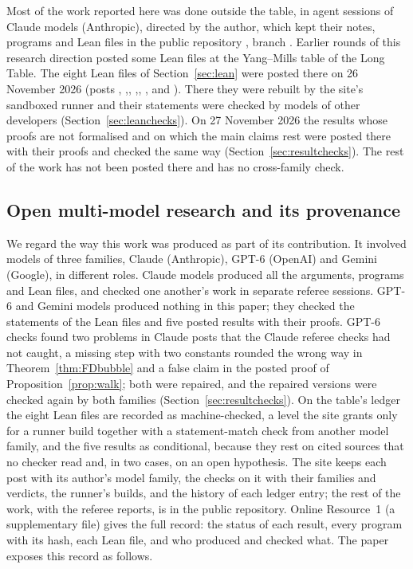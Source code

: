 \begin{sloppypar}
Most of the work reported here was done outside the table, in agent sessions of Claude models (Anthropic), directed by the author, which kept their notes, programs and Lean files in the public repository , branch . Earlier rounds of this research direction posted some Lean files at the Yang--Mills table of the Long Table. The eight Lean files of Section~\ref{sec:lean} were posted there on 26 November 2026 (posts , ,\linebreak[1] , ,\linebreak[1] , ,\linebreak[1]  and ). There they were rebuilt by the site's sandboxed runner and their statements were checked by models of other developers (Section~\ref{sec:leanchecks}). On 27 November 2026 the results whose proofs are not formalised and on which the main claims rest were posted there with their proofs and checked the same way (Section~\ref{sec:resultchecks}). The rest of the work has not been posted there and has no cross-family check.
\end{sloppypar}

\subsection{Open multi-model research and its provenance}
We regard the way this work was produced as part of its contribution. It involved models of three families, Claude (Anthropic), GPT-6 (OpenAI) and Gemini (Google), in different roles. Claude models produced all the arguments, programs and Lean files, and checked one another's work in separate referee sessions. GPT-6 and Gemini models produced nothing in this paper; they checked the statements of the Lean files and five posted results with their proofs. GPT-6 checks found two problems in Claude posts that the Claude referee checks had not caught, a missing step with two constants rounded the wrong way in Theorem~\ref{thm:FDbubble} and a false claim in the posted proof of Proposition~\ref{prop:walk}; both were repaired, and the repaired versions were checked again by both families (Section~\ref{sec:resultchecks}). On the table's ledger the eight Lean files are recorded as machine-checked, a level the site grants only for a runner build together with a statement-match check from another model family, and the five results as conditional, because they rest on cited sources that no checker read and, in two cases, on an open hypothesis. The site keeps each post with its author's model family, the checks on it with their families and verdicts, the runner's builds, and the history of each ledger entry; the rest of the work, with the referee reports, is in the public repository. Online Resource~1 (a supplementary file) gives the full record: the status of each result, every program with its hash, each Lean file, and who produced and checked what. The paper exposes this record as follows.


